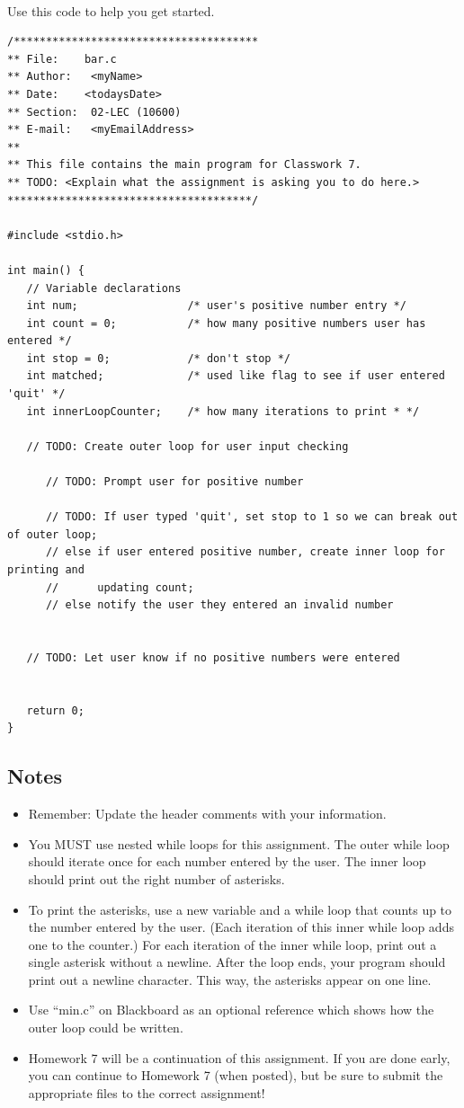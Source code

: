\documentclass[letter,11pt]{article}
\begin{document}
\paragraph{}Use this code to help you get started.
\begin{verbatim}
/**************************************
** File:    bar.c
** Author:   <myName>
** Date:    <todaysDate>
** Section:  02-LEC (10600)
** E-mail:   <myEmailAddress>
**
** This file contains the main program for Classwork 7.
** TODO: <Explain what the assignment is asking you to do here.>
**************************************/

#include <stdio.h>

int main() {
   // Variable declarations
   int num;                 /* user's positive number entry */
   int count = 0;           /* how many positive numbers user has entered */
   int stop = 0;            /* don't stop */
   int matched;             /* used like flag to see if user entered 'quit' */
   int innerLoopCounter;    /* how many iterations to print * */

   // TODO: Create outer loop for user input checking

      // TODO: Prompt user for positive number

      // TODO: If user typed 'quit', set stop to 1 so we can break out of outer loop;
      // else if user entered positive number, create inner loop for printing and 
      //      updating count;
      // else notify the user they entered an invalid number


   // TODO: Let user know if no positive numbers were entered


   return 0;
}
\end{verbatim}

\subsection*{Notes}
\begin{itemize}
    \item Remember: Update the header comments with your information.
    \item You MUST use nested while loops for this assignment. The outer while loop should iterate once for each number entered by the user. The inner loop should print out the right number of asterisks.
    \item To print the asterisks, use a new variable and a while loop that counts up to the number entered by the user. (Each iteration of this inner while loop adds one to the counter.) For each iteration of the inner while loop, print out a single asterisk without a newline. After the loop ends, your program should print out a newline character. This way, the asterisks appear on one line.
    \item Use ``min.c'' on Blackboard as an optional reference which shows how the outer loop could be written.
    \item Homework 7 will be a continuation of this assignment. If you are done early, you can continue to Homework 7 (when posted), but be sure to submit the appropriate files to the correct assignment!
\end{itemize}
\end{document}
